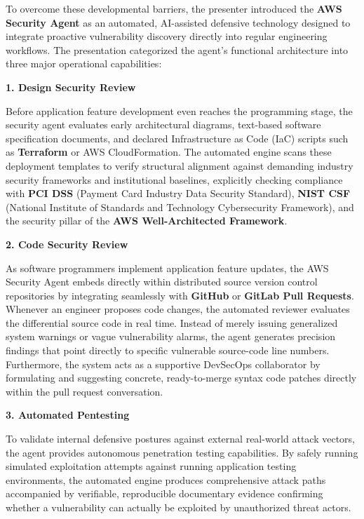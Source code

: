 To overcome these developmental barriers, the presenter introduced the
\textbf{AWS Security Agent} as an automated, AI-assisted defensive
technology designed to integrate proactive vulnerability discovery
directly into regular engineering workflows. The presentation
categorized the agent's functional architecture into three major
operational capabilities:

\vspace{0.5em}\noindent\textbf{1. Design Security Review}\par

Before application feature development even reaches the programming
stage, the security agent evaluates early architectural diagrams,
text-based software specification documents, and declared Infrastructure
as Code (IaC) scripts such as \textbf{Terraform} or AWS CloudFormation.
The automated engine scans these deployment templates to verify
structural alignment against demanding industry security frameworks and
institutional baselines, explicitly checking compliance with \textbf{PCI
DSS} (Payment Card Industry Data Security Standard), \textbf{NIST CSF}
(National Institute of Standards and Technology Cybersecurity
Framework), and the security pillar of the \textbf{AWS Well-Architected
Framework}.

\vspace{0.5em}\noindent\textbf{2. Code Security Review}\par

As software programmers implement application feature updates, the AWS
Security Agent embeds directly within distributed source version control
repositories by integrating seamlessly with \textbf{GitHub} or
\textbf{GitLab Pull Requests}. Whenever an engineer proposes code
changes, the automated reviewer evaluates the differential source code
in real time. Instead of merely issuing generalized system warnings or
vague vulnerability alarms, the agent generates precision findings that
point directly to specific vulnerable source-code line numbers.
Furthermore, the system acts as a supportive DevSecOps collaborator by
formulating and suggesting concrete, ready-to-merge syntax code patches
directly within the pull request conversation.

\vspace{0.5em}\noindent\textbf{3. Automated Pentesting}\par

To validate internal defensive postures against external real-world
attack vectors, the agent provides autonomous penetration testing
capabilities. By safely running simulated exploitation attempts against
running application testing environments, the automated engine produces
comprehensive attack paths accompanied by verifiable, reproducible
documentary evidence confirming whether a vulnerability can actually be
exploited by unauthorized threat actors.

